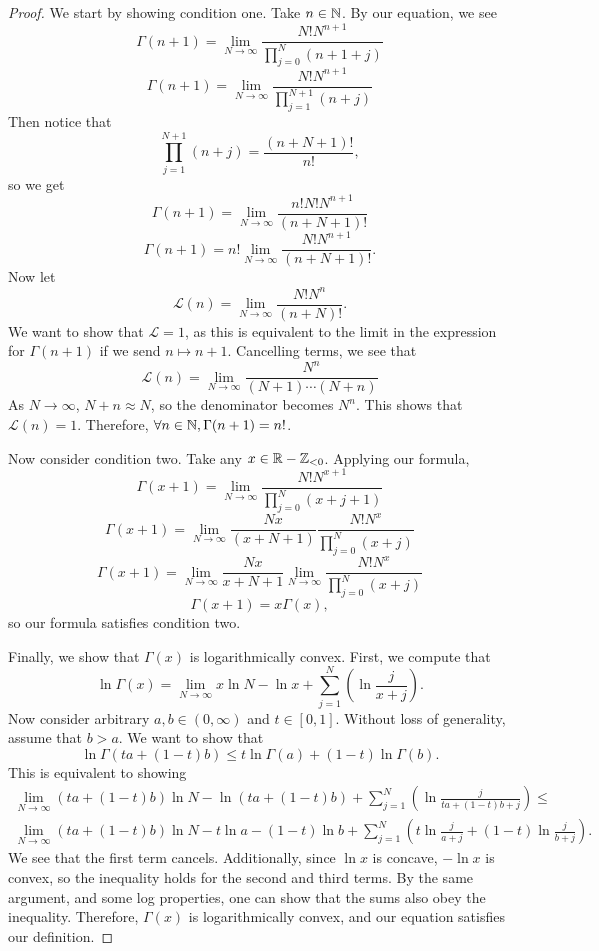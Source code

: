 \begin{proof}
We start by showing condition one.
Take $n \in \mathbb{N}$.
By our equation, we see
$$\Gamma(n+1) = \lim_{N \rightarrow \infty} \frac{N!N^{n+1}}{\prod_{j=0}^N (n+1+j)}$$
$$\Gamma(n+1) = \lim_{N \rightarrow \infty} \frac{N!N^{n+1}}{\prod_{j=1}^{N+1} (n+j)}$$
Then notice that 
$$\prod_{j=1}^{N+1} (n+j) = \frac{(n+N+1)!}{n!},$$
so we get 
$$\Gamma(n+1) = \lim_{N \rightarrow \infty} \frac{n! N! N^{n+1}}{(n+N+1)!}$$
$$\Gamma(n+1) = n! \lim_{N \rightarrow \infty} \frac{N! N^{n+1}}{(n+N+1)!}.$$
Now let 
$$\mathcal{L}(n) = \lim_{N \rightarrow \infty} \frac{N! N^n}{(n+N)!}.$$
We want to show that $\mathcal{L} = 1$, as this is equivalent to the limit in the expression for $\Gamma(n+1)$ if we send $n \mapsto n+1$.
Cancelling terms, we see that
$$\mathcal{L}(n) = \lim_{N \rightarrow \infty} \frac{N^n}{(N+1)\cdots(N+n)}$$
As $N \rightarrow \infty$, $N + n \approx N$, so the denominator becomes $N^n$.
This shows that $\mathcal{L}(n) = 1$.
Therefore, $\forall n \in \mathbb{N}, \Gamma(n+1) = n!$.

Now consider condition two. 
Take any $x \in \mathbb{R} - \mathbb{Z}_{< 0}$.
Applying our formula, 
$$\Gamma(x+1) = \lim_{N \rightarrow \infty} \frac{N!N^{x+1}}{\prod_{j=0}^N (x + j + 1)}$$
$$\Gamma(x+1) = \lim_{N \rightarrow \infty} \frac{Nx}{(x+N+1)} \frac{N! N^x}{\prod_{j=0}^N (x+j)}$$
$$\Gamma(x+1) = \lim_{N \rightarrow \infty} \frac{Nx}{x+N+1} \lim_{N \rightarrow \infty} \frac{N! N^x}{\prod_{j=0}^N (x+j)}$$
$$\Gamma(x+1) = x \Gamma(x),$$
so our formula satisfies condition two. 

Finally, we show that $\Gamma(x)$ is logarithmically convex. 
First, we compute that 
$$\ln \Gamma (x) = \lim_{N \rightarrow \infty} x\ln N - \ln x + \sum_{j=1}^N \left(\ln\frac{j}{x+j}\right).$$
Now consider arbitrary $a, b \in (0, \infty)$ and $t \in [0,1]$.
Without loss of generality, assume that $b > a$.
We want to show that
$$\ln\Gamma(ta + (1-t)b) \leq t\ln\Gamma(a) + (1-t)\ln\Gamma(b).$$
This is equivalent to showing
\begin{multline*}
    \lim_{N \rightarrow \infty} (ta + (1-t)b)\ln N - \ln (ta + (1-t)b) + \sum_{j=1}^N \left( \ln \frac{j}{ta + (1-t)b + j} \right) \leq \\ \lim_{N \rightarrow \infty} 
    (ta + (1-t)b)\ln N - t\ln a - (1-t)\ln b + \sum_{j=1}^N \left( t\ln \frac{j}{a+j} + (1-t) \ln \frac{j}{b+j} \right).
\end{multline*}
We see that the first term cancels.
Additionally, since $\ln x$ is concave, $-\ln x$ is convex, so the inequality holds for the second and third terms. 
By the same argument, and some log properties, one can show that the sums also obey the inequality.
Therefore, $\Gamma(x)$ is logarithmically convex, and our equation satisfies our definition. 
\end{proof}

